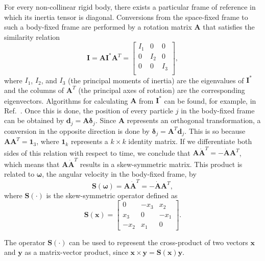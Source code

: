 \documentclass[aip,jcp,reprint,amsmath,amssymb]{revtex4-1}
\newcommand{\mt}[1]{\boldsymbol{\mathbf{#1}}}           %
\newcommand{\vt}[1]{\boldsymbol{\mathbf{#1}}}           %
\newcommand{\tr}[1]{#1^T}                               %
\begin{document}
For every non-collinear rigid body, there exists a particular frame of reference in which its inertia tensor is diagonal. Conversions from the space-fixed frame to such a body-fixed frame are performed by a rotation matrix $\mt A$ that satisfies the similarity relation\citep{Goldstein2002}
\[
{\mt I} = {\mt A} {\mt I}^\ast \tr{\mt A} = \left[ \begin{array}{ccc}
I_1 &   0 &   0 \\
  0 & I_2 &   0 \\
  0 &   0 & I_3 \\
\end{array} \right],
\]
where $I_1$, $I_2$, and $I_3$ (the principal moments of inertia) are the eigenvalues of ${\mt I}^\ast$ and the columns of $\tr{\mt A}$ (the principal axes of rotation) are the corresponding eigenvectors. Algorithms for calculating $\mt A$ from $\mt I^\ast$ can be found, for example, in Ref.~. Once this is done, the position of every particle $j$ in the body-fixed frame can be obtained by ${\vt d}_j = {\mt A} {\vt \delta}_j$. Since $\mt A$ represents an orthogonal transformation, a conversion in the opposite direction is done by ${\vt \delta}_j = \tr{\mt A} {\vt d}_j$.\cite{Goldstein2002} This is so because $\mt A \tr{\mt A} = \mt 1_3$, where $\mt 1_k$ represents a $k \times k$ identity matrix. If we differentiate both sides of this relation with respect to time, we conclude that $\mt A \tr{\dot {\mt A}} = - \dot{\mt A} \tr{\mt A}$, which means that $\mt A \tr{\dot{\mt A}}$ results in a skew-symmetric matrix. This product is related to $\vt \omega$, the angular velocity in the body-fixed frame, by\cite{Haug1989}
\begin{equation}
\label{eq:relation_A_omega}
\mt S(\vt \omega) = \mt A \tr{\dot{\mt A}} = -\dot{\mt A} \tr{\mt A},
\end{equation}
where $\mt S(\cdot)$ is the skew-symmetric operator defined as
\begin{equation}
\label{eq:operator_S}
\mt S(\vt x) = \left[ \begin{array}{ccc}
 0   & -x_3 &  x_2 \\
 x_3 &  0   & -x_1 \\
-x_2 &  x_1 &  0
\end{array}\right].
\end{equation}

The operator  $\mt S(\cdot)$ can be used to represent the cross-product of two vectors $\vt x$ and $\vt y$ as a matrix-vector product, since $\vt x \times \vt y = \mt S(\vt x)\vt y$.
\end{document}

